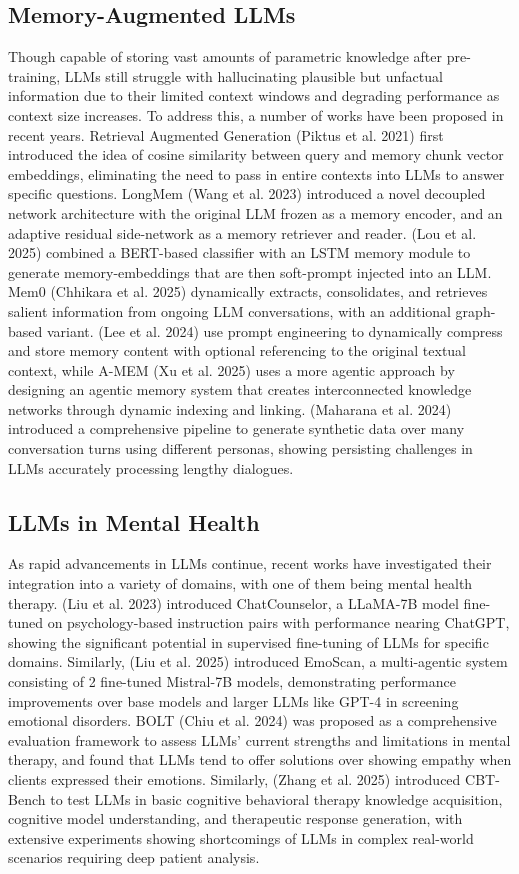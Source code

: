 \documentclass{article} %
\begin{document}
\subsection{Memory-Augmented LLMs}
Though capable of storing vast amounts of parametric knowledge after pre-training, LLMs still struggle with hallucinating plausible but unfactual information due to their limited context windows and degrading performance as context size increases. To address this, a number of works have been proposed in recent years. Retrieval Augmented Generation (Piktus et al. 2021) first introduced the idea of cosine similarity between query and memory chunk vector embeddings, eliminating the need to pass in entire contexts into LLMs to answer specific questions.  LongMem (Wang et al. 2023) introduced a novel decoupled network architecture with the original LLM frozen as a memory encoder, and an adaptive residual side-network as a memory retriever and reader. (Lou et al. 2025) combined a BERT-based classifier with an LSTM memory module to generate memory-embeddings that are then soft-prompt injected into an LLM. Mem0 (Chhikara et al. 2025) dynamically extracts, consolidates, and retrieves salient information from ongoing LLM conversations, with an additional graph-based variant. (Lee et al. 2024) use prompt engineering to dynamically compress and store memory content with optional referencing to the original textual context, while A-MEM (Xu et al. 2025) uses a more agentic approach by designing an agentic memory system that creates interconnected knowledge networks through dynamic indexing and linking. (Maharana et al. 2024) introduced a comprehensive pipeline to generate synthetic data over many conversation turns using different personas, showing persisting challenges in LLMs accurately processing lengthy dialogues. 


\subsection{LLMs in Mental Health}
As rapid advancements in LLMs continue, recent works have investigated their integration into a variety of domains, with one of them being mental health therapy. (Liu et al. 2023) introduced ChatCounselor, a LLaMA-7B model fine-tuned on psychology-based instruction pairs with performance nearing ChatGPT, showing the significant potential in supervised fine-tuning of LLMs for specific domains. Similarly, (Liu et al. 2025) introduced EmoScan, a multi-agentic system consisting of 2 fine-tuned Mistral-7B models, demonstrating performance improvements over base models and larger LLMs like GPT-4 in screening emotional disorders. BOLT (Chiu et al. 2024) was proposed as a comprehensive evaluation framework to assess LLMs’ current strengths and limitations in mental therapy, and found that LLMs tend to offer solutions over showing empathy when clients expressed their emotions. Similarly, (Zhang et al. 2025) introduced CBT-Bench to test LLMs in basic cognitive behavioral therapy knowledge acquisition, cognitive model understanding, and therapeutic response generation, with extensive experiments showing shortcomings of LLMs in complex real-world scenarios requiring deep patient analysis. 
\end{document}
